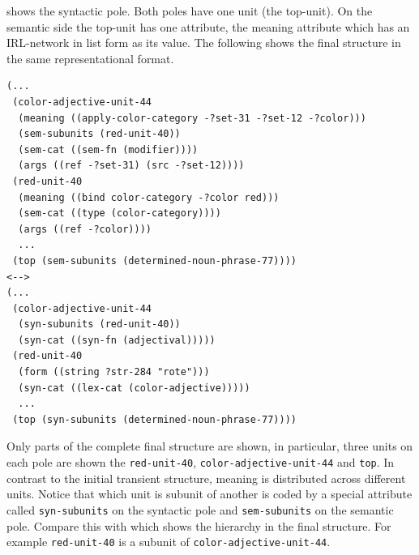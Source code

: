 shows the syntactic pole. Both poles have one unit (the top-unit). 
On the semantic side the top-unit has one attribute, the meaning attribute
which has an IRL-network in list form as its value. 
The following shows the final structure in the same representational 
format.
\begin{lstlisting}
(...
 (color-adjective-unit-44
  (meaning ((apply-color-category -?set-31 -?set-12 -?color)))
  (sem-subunits (red-unit-40))
  (sem-cat ((sem-fn (modifier))))
  (args ((ref -?set-31) (src -?set-12))))
 (red-unit-40
  (meaning ((bind color-category -?color red)))
  (sem-cat ((type (color-category))))
  (args ((ref -?color))))
  ...
 (top (sem-subunits (determined-noun-phrase-77))))
<-->
(...
 (color-adjective-unit-44
  (syn-subunits (red-unit-40))
  (syn-cat ((syn-fn (adjectival)))))
 (red-unit-40
  (form ((string ?str-284 "rote")))
  (syn-cat ((lex-cat (color-adjective)))))
  ...
 (top (syn-subunits (determined-noun-phrase-77))))
\end{lstlisting}
Only parts of the complete final structure are shown,
in particular, three units on each pole are shown the 
{\footnotesize\tt red-unit-40}, {\footnotesize\tt color-adjective-unit-44}
and {\footnotesize\tt top}. In contrast to the initial transient structure,
meaning is distributed across different units.
Notice that which unit is subunit of another is coded by a special
attribute called {\footnotesize\tt syn-subunits} on the syntactic pole
and {\footnotesize\tt sem-subunits} on the semantic pole. Compare
this with  which shows the hierarchy in the final 
structure. For example {\footnotesize\tt red-unit-40} is a subunit of 
{\footnotesize\tt color-adjective-unit-44}.

